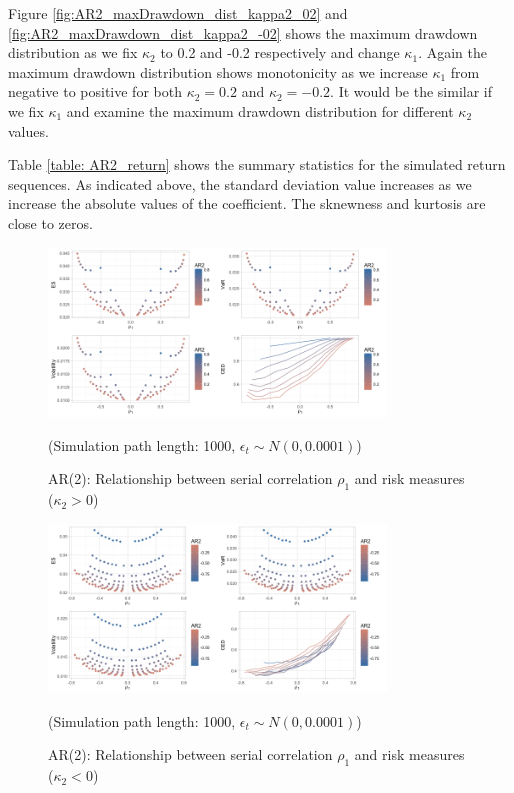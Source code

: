 \documentclass[11pt]{article}
\begin{document}
Figure \ref{fig:AR2_maxDrawdown_dist_kappa2_02} and \ref{fig:AR2_maxDrawdown_dist_kappa2_-02} shows the maximum drawdown distribution as we fix $\kappa_2$ to 0.2 and -0.2 respectively and change $\kappa_1$. Again the maximum drawdown distribution shows monotonicity as we increase $\kappa_1$ from negative to positive for both $\kappa_2 = 0.2 $ and $\kappa_2 = -0.2$. It would be the similar if we fix $\kappa_1$ and examine the maximum drawdown distribution for different $\kappa_2$ values.  

Table \ref{table: AR2_return} shows the summary statistics for the simulated return sequences. As indicated above, the standard deviation value increases as we increase the absolute values of the coefficient. The sknewness and kurtosis are close to zeros.

\begin{figure}[H]
\centering
\includegraphics[width = 0.8\textwidth]{../figures/simulation/AR2_risk_measures_pos}
\caption{AR(2): Relationship between serial correlation $\rho_1$ and risk measures ($\kappa_2 > 0$)}
(Simulation path length: 1000, $\epsilon_t \sim N(0, 0.0001)$)
\label{fig:AR2_risk_measures_pos}
\end{figure}

\begin{figure}[H]
\centering
\includegraphics[width = 0.8\textwidth]{../figures/simulation/AR2_risk_measures_neg}
\caption{AR(2): Relationship between serial correlation $\rho_1$ and risk measures ($\kappa_2 < 0$)}
(Simulation path length: 1000, $\epsilon_t \sim N(0, 0.0001)$)
\label{fig:AR2_risk_measures_neg}
\end{figure}
\end{document}
